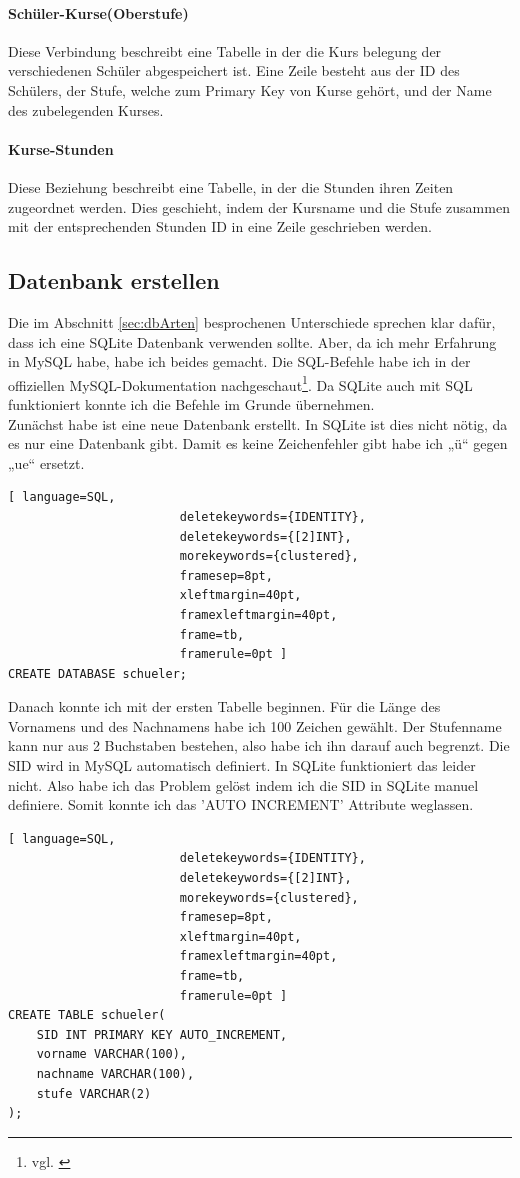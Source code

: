 \documentclass[a4paper, 12pt]{article}
\theoremstyle{plain}
\theoremstyle{definition}
\begin{document}
\paragraph{Schüler-Kurse(Oberstufe)}
Diese Verbindung beschreibt eine Tabelle in der die Kurs belegung der verschiedenen Schüler abgespeichert ist. Eine Zeile besteht aus der ID des Schülers, der Stufe, welche zum Primary Key von Kurse  gehört, und der Name des zubelegenden Kurses.
\paragraph{Kurse-Stunden}
Diese Beziehung beschreibt eine Tabelle, in der die Stunden ihren Zeiten zugeordnet werden. Dies geschieht, indem der Kursname und die Stufe zusammen mit der entsprechenden Stunden ID in eine Zeile geschrieben werden.

	\subsection{Datenbank erstellen}
	\label{sec:dbErst}
	Die im Abschnitt \ref{sec:dbArten} besprochenen Unterschiede sprechen klar dafür, dass ich eine SQLite Datenbank verwenden sollte. Aber, da ich mehr Erfahrung in MySQL habe, habe ich beides gemacht. Die SQL-Befehle habe ich in der offiziellen MySQL-Dokumentation nachgeschaut\footnote{vgl. \cite{sqlDocu}}. Da SQLite auch mit SQL funktioniert konnte ich die Befehle im Grunde übernehmen. \\ 

Zunächst habe ist eine neue Datenbank erstellt. In SQLite ist dies nicht nötig, da es nur eine Datenbank gibt. Damit es keine Zeichenfehler gibt habe ich „ü“ gegen „ue“ ersetzt.
	\begin{lstlisting}[ language=SQL,
	                    deletekeywords={IDENTITY},
	                    deletekeywords={[2]INT},
	                    morekeywords={clustered},
	                    framesep=8pt,
	                    xleftmargin=40pt,
	                    framexleftmargin=40pt,
	                    frame=tb,
	                    framerule=0pt ]
CREATE DATABASE schueler;\end{lstlisting}
Danach konnte ich mit der ersten Tabelle beginnen. Für die Länge des Vornamens und des Nachnamens habe ich 100 Zeichen gewählt. Der Stufenname kann nur aus 2 Buchstaben bestehen, also habe ich ihn darauf auch begrenzt. Die SID wird in MySQL automatisch definiert. In SQLite funktioniert das leider nicht. Also habe ich das Problem gelöst indem ich die SID in SQLite manuel definiere. Somit konnte ich das 'AUTO INCREMENT' Attribute weglassen.
	\begin{lstlisting}[ language=SQL,
	                    deletekeywords={IDENTITY},
	                    deletekeywords={[2]INT},
	                    morekeywords={clustered},
	                    framesep=8pt,
	                    xleftmargin=40pt,
	                    framexleftmargin=40pt,
	                    frame=tb,
	                    framerule=0pt ]
CREATE TABLE schueler(
	SID INT PRIMARY KEY AUTO_INCREMENT, 
	vorname VARCHAR(100), 
	nachname VARCHAR(100), 
	stufe VARCHAR(2)
);\end{lstlisting}
\end{document}
